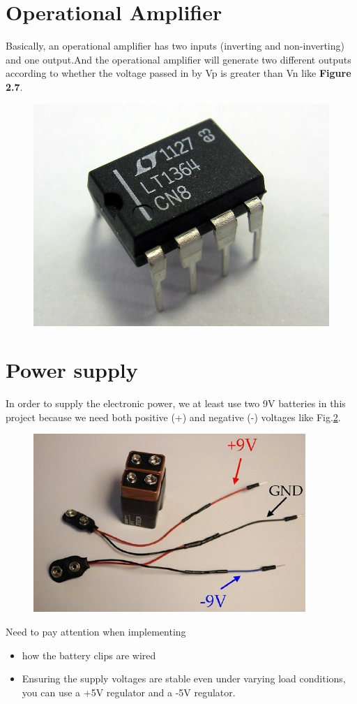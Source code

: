 \documentclass[a4paper, 12pt, AutoFakeBold]{report}
\newcommand{\figref}[1]{Fig.\ref{#1}}
\begin{document}
    \section{Operational Amplifier}
    Basically, an operational amplifier has two inputs (inverting and non-inverting) and one output.And the operational amplifier will generate two different outputs according to whether the voltage passed in by Vp is greater than Vn like \textbf{Figure 2.7}.
    \begin{figure}[H]
        \centering
        \includegraphics[scale=.3]{figs/Fig1-2.jpg}
        \caption{}
        \label{fig:1.2}
    \end{figure}

    \section{Power supply}
    In order to supply the electronic power, we at least use two 9V batteries in this project because we need both positive (+) and negative (-) voltages like \figref{fig:1.3}.
    \begin{figure}[H]
        \centering
        \includegraphics[scale=1]{figs/Fig1-3.jpg}
        \caption{}
        \label{fig:1.3}
    \end{figure}
    \noindent Need to pay attention when implementing
    \begin{itemize}
        \item how the battery clips are wired
        \item Ensuring the supply voltages are stable even under varying load conditions, you can use a +5V regulator and a -5V regulator.
    \end{itemize}
\end{document}
